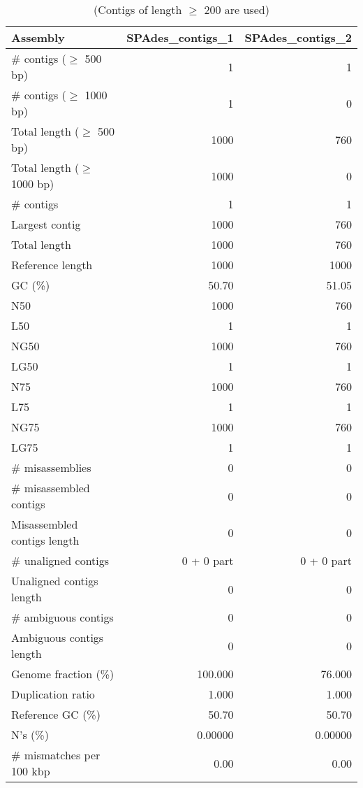 \begin{table}[ht]
\begin{center}
\caption{(Contigs of length $\geq$ 200 are used)}
\begin{tabular}{|l*{2}{|r}|}
\hline
Assembly & SPAdes\_contigs\_1 & SPAdes\_contigs\_2 \\ \hline
\# contigs ($\geq$ 500 bp) & 1 & 1 \\ \hline
\# contigs ($\geq$ 1000 bp) & 1 & 0 \\ \hline
Total length ($\geq$ 500 bp) & 1000 & 760 \\ \hline
Total length ($\geq$ 1000 bp) & 1000 & 0 \\ \hline
\# contigs & 1 & 1 \\ \hline
Largest contig & 1000 & 760 \\ \hline
Total length & 1000 & 760 \\ \hline
Reference length & 1000 & 1000 \\ \hline
GC (\%) & 50.70 & 51.05 \\ \hline
N50 & 1000 & 760 \\ \hline
L50 & 1 & 1 \\ \hline
NG50 & 1000 & 760 \\ \hline
LG50 & 1 & 1 \\ \hline
N75 & 1000 & 760 \\ \hline
L75 & 1 & 1 \\ \hline
NG75 & 1000 & 760 \\ \hline
LG75 & 1 & 1 \\ \hline
\# misassemblies & 0 & 0 \\ \hline
\# misassembled contigs & 0 & 0 \\ \hline
Misassembled contigs length & 0 & 0 \\ \hline
\# unaligned contigs & 0 + 0 part & 0 + 0 part \\ \hline
Unaligned contigs length & 0 & 0 \\ \hline
\# ambiguous contigs & 0 & 0 \\ \hline
Ambiguous contigs length & 0 & 0 \\ \hline
Genome fraction (\%) & 100.000 & 76.000 \\ \hline
Duplication ratio & 1.000 & 1.000 \\ \hline
Reference GC (\%) & 50.70 & 50.70 \\ \hline
N's (\%) & 0.00000 & 0.00000 \\ \hline
\# mismatches per 100 kbp & 0.00 & 0.00 \\ \hline

\end{tabular}
\end{center}
\end{table}
